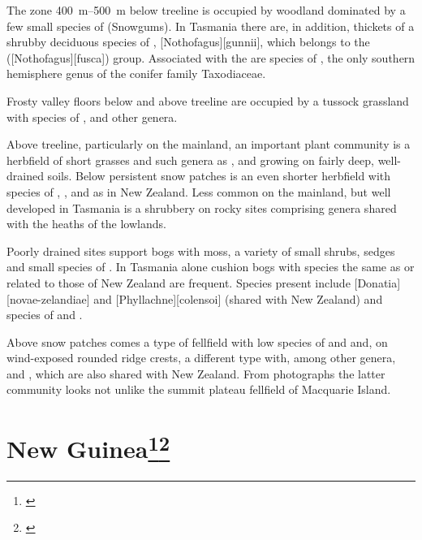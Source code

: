 The zone \SIrange{400}{500}{\metre} below treeline is occupied by woodland dominated by a few small species of  (Snowgums).
In Tasmania there are, in addition, thickets of a shrubby deciduous species of , [Nothofagus][gunnii], which belongs to the  ([Nothofagus][fusca]) group.
Associated with the  are species of , the only southern hemisphere genus of the conifer family Taxodiaceae.

Frosty valley floors below and above treeline are occupied by a tussock grassland with species of ,  and other genera.

Above treeline, particularly on the mainland, an important plant community is a herbfield of short grasses and such genera as ,  and  growing on fairly deep, well-drained soils.
Below persistent snow patches is an even shorter herbfield with species of , ,  and  as in New Zealand.
Less common on the mainland, but well developed in Tasmania is a shrubbery on rocky sites comprising genera shared with the heaths of the lowlands.

Poorly drained sites support bogs with  moss, a variety of small shrubs, sedges and small species of .
In Tasmania alone cushion bogs with species the same as or related to those of New Zealand are frequent.
Species present include [Donatia][novae-zelandiae] and [Phyllachne][colensoi] (shared with New Zealand) and species of  and .

Above snow patches comes a type of fellfield with low species of  and  and, on wind-exposed rounded ridge crests, a different type with, among other genera,  and , which are also shared with New Zealand.
From photographs the latter community looks not unlike the summit plateau fellfield of Macquarie Island.

\section[New Guinea]{New Guinea\thinspace\footnote{\cite{johns1982plant}}\footnote{\cite{wardle1973newguinea}}}

